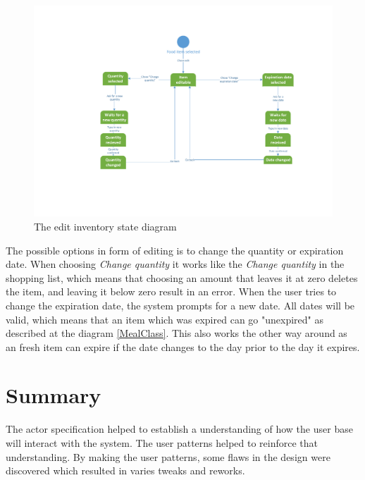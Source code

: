 \begin{figure}[H]
	\centering
	\includegraphics[width=1.0\textwidth]{ApplicationDomain/spEditInventory.pdf} 
	\caption{The edit inventory state diagram}
	\label{spEditInventory}
\end{figure}
The possible options in form of editing is to change the quantity or expiration date. 
When choosing \textit{Change quantity} it works like the \textit{Change quantity} in the shopping list, which means that choosing an amount that leaves it at zero deletes the item, and leaving it below zero result in an error. When the user tries to change the expiration date, the system prompts for a new date. All dates will be valid, which means that an item which was expired can go "unexpired" as described at the diagram \cref{MealClass}. This also works the other way around as an fresh item can expire if the date changes to the day prior to the day it expires.


\section*{Summary}
The actor specification helped to establish a understanding of how the user base will interact with the system. The user patterns helped to reinforce that understanding. By making the user patterns, some flaws in the design were discovered which resulted in varies tweaks and reworks.